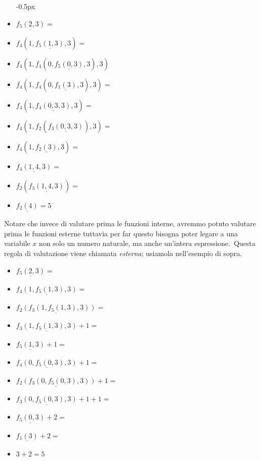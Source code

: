 \begin{example}{\label{Somma}}
    \begin{itemize}
        \itemsep-0.5px
        \item[] $\underline{f_5(2,3)}=$
        \item[] $f_4(1, \underline{f_5(1,3)},3)=$
        \item[] $f_4(1, f_4(0,\underline{f_5(0,3)},3),3)$
        \item[] $f_4(1,f_4(0,\underline{f_1(3)},3),3) =$
        \item[] $f_4(1, \underline{f_4(0,3,3)}, 3) =$
        \item[] $f_4(1,f_2(\underline{f_3(0,3,3)}),3) =$
        \item[] $f_4(1,\underline{f_2(3)},3) =$
        \item[] $\underline{f_4(1,4,3)} =$
        \item[] $f_2(\underline{f_3(1,4,3)}) =$
        \item[] $\underline{f_2(4)} = 5$
    \end{itemize}

    \noindent Notare che invece di valutare prima le funzioni interne, avremmo potuto valutare prima le funzioni esterne tuttavia per far questo bisogna poter legare a una variabile $x$ non solo un numero naturale, ma anche un'intera espressione.\
    Questa regola di valutazione viene chiamata \textit{esterna}; usiamola nell'esempio di sopra.

    \begin{itemize}
        \itemsep-0.5px
        \item[] $\underline{f_5(2,3)}=$
        \item[] $\underline{f_4(1, f_5(1,3), 3)}=$
        \item[] $\underline{f_2(f_3(1, f_5(1,3), 3))}=$
        \item[] $\underline{f_3(1, f_5(1,3), 3)}+1=$
        \item[] $\underline{f_5(1,3)}+1=$
        \item[] $\underline{f_4(0, f_5(0,3), 3)}+1=$
        \item[] $\underline{f_2(f_3(0, f_5(0,3), 3))}+1=$
        \item[] $\underline{f_3(0, f_5(0,3), 3)}+1 +1=$
        \item[] $\underline{f_5(0,3)} + 2=$
        \item[] $\underline{f_1(3)} + 2=$
        \item[] $3 + 2 = 5$
    \end{itemize}


\end{example}

